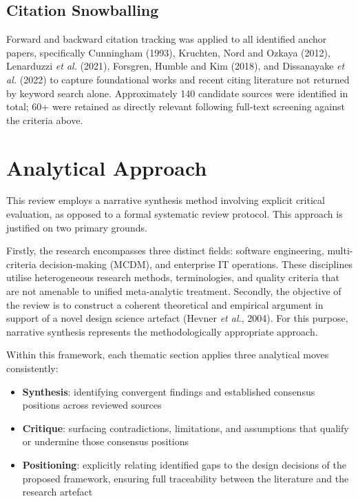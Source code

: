 \documentclass[
  11pt,
  letterpaper,
  11pt,
  oneside,
  english,
  onehalfspacing,
  headsepline]{MastersDoctoralThesis}
\providecommand{\tightlist}{%
  \setlength{\itemsep}{0pt}\setlength{\parskip}{0pt}}
\begin{document}
\subsection{Citation Snowballing}\label{citation-snowballing}

Forward and backward citation tracking was applied to all identified
anchor papers, specifically Cunningham (1993), Kruchten, Nord and Ozkaya
(2012), Lenarduzzi \emph{et al.} (2021), Forsgren, Humble and Kim
(2018), and Dissanayake \emph{et al.} (2022) to capture foundational
works and recent citing literature not returned by keyword search alone.
Approximately 140 candidate sources were identified in total; 60+ were
retained as directly relevant following full-text screening against the
criteria above.

\section{Analytical Approach}\label{analytical-approach}

This review employs a narrative synthesis method involving explicit
critical evaluation, as opposed to a formal systematic review protocol.
This approach is justified on two primary grounds.

Firstly, the research encompasses three distinct fields: software
engineering, multi-criteria decision-making (MCDM), and enterprise IT
operations. These disciplines utilise heterogeneous research methods,
terminologies, and quality criteria that are not amenable to unified
meta-analytic treatment. Secondly, the objective of the review is to
construct a coherent theoretical and empirical argument in support of a
novel design science artefact (Hevner \emph{et al.}, 2004). For this
purpose, narrative synthesis represents the methodologically appropriate
approach.

Within this framework, each thematic section applies three analytical
moves consistently:

\begin{itemize}
\tightlist
\item
  \textbf{Synthesis}: identifying convergent findings and established
  consensus positions across reviewed sources
\item
  \textbf{Critique}: surfacing contradictions, limitations, and
  assumptions that qualify or undermine those consensus positions
\item
  \textbf{Positioning}: explicitly relating identified gaps to the
  design decisions of the proposed framework, ensuring full traceability
  between the literature and the research artefact
\end{itemize}
\end{document}

